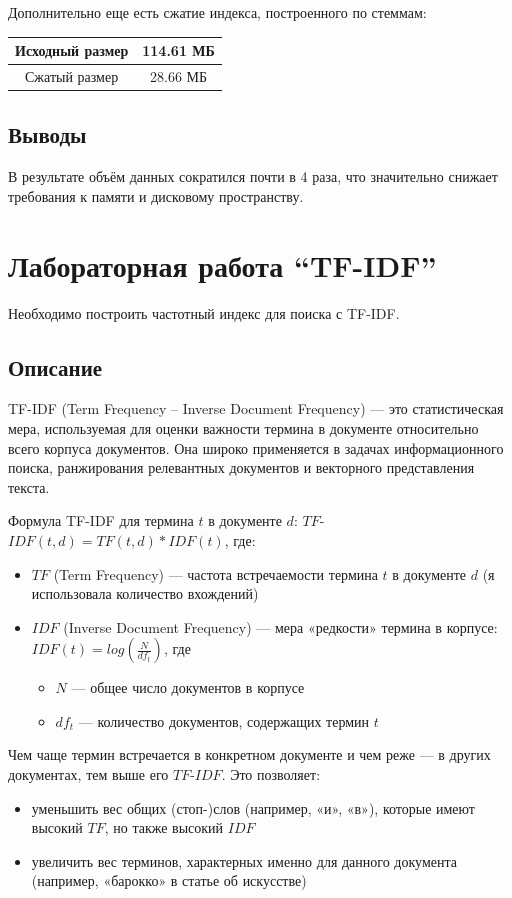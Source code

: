 \documentclass[pdf, unicode, 12pt, a4paper, oneside, fleqn]{article}
\begin{document}
Дополнительно еще есть сжатие индекса, построенного по стеммам:

\begin{center}
\begin{tabular}{ |c|c| }
\hline
 Исходный размер & 114.61 МБ \\
 \hline
 Сжатый размер & 28.66 МБ \\
 \hline
\end{tabular}
\end{center} 

\subsection*{Выводы}
В результате объём данных сократился почти в 4 раза, что значительно снижает требования к памяти и дисковому пространству.

\pagebreak

\section{Лабораторная работа  \enquote{TF-IDF}}

Необходимо построить частотный индекс для поиска с TF-IDF.

\subsection*{Описание}
TF-IDF (Term Frequency – Inverse Document Frequency) — это статистическая мера, используемая для оценки важности термина в документе относительно всего корпуса документов. Она широко применяется в задачах информационного поиска, ранжирования релевантных документов и векторного представления текста.

Формула TF-IDF для термина $t$ в документе $d$: $TF$-$IDF(t,d)=TF(t,d)*IDF(t)$, где:
\begin{itemize}
    \item $TF$ (Term Frequency) — частота встречаемости термина $t$ в документе $d$ (я использовала количество вхождений)
    \item $IDF$ (Inverse Document Frequency) — мера «редкости» термина в корпусе: $IDF(t) = log(\frac{N}{df_t})$, где
    \begin{itemize}
        \item $N$ — общее число документов в корпусе
        \item $df_t$ — количество документов, содержащих термин $t$
    \end{itemize}
\end{itemize}
Чем чаще термин встречается в конкретном документе и чем реже — в других документах, тем выше его $TF$-$IDF$. Это позволяет:
\begin{itemize}
    \item уменьшить вес общих (стоп-)слов (например, «и», «в»), которые имеют высокий $TF$, но также высокий $IDF$
    \item увеличить вес терминов, характерных именно для данного документа (например, «барокко» в статье об искусстве)
\end{itemize}
\end{document}

